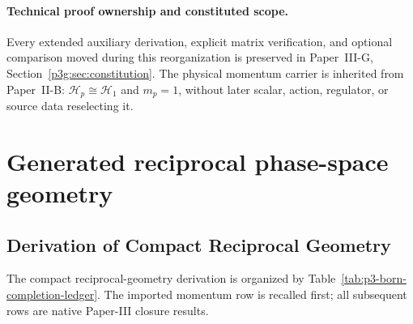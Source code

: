 \documentclass[12pt,a4paper]{article}
\begin{document}
\paragraph{Technical proof ownership and constituted scope.}
Every extended auxiliary derivation, explicit matrix verification,
and optional comparison moved during this reorganization is
preserved in Paper~III-G, Section~\ref{p3g:sec:constitution}.
The physical momentum carrier is inherited from Paper~II-B:
$\mathcal H_p\cong\mathcal H_1$ and $m_p=1$, without later
scalar, action, regulator, or source data reselecting it.

\section{Generated reciprocal phase-space geometry}
\label{paper3a:sec:organized-reciprocal}
\subsection{Derivation of Compact Reciprocal Geometry}
\label{p3:sec:phasespace}

The compact reciprocal-geometry derivation is organized by Table~\ref{tab:p3-born-completion-ledger}.  The imported momentum row is recalled first; all subsequent rows are native Paper-III closure results.
\end{document}

